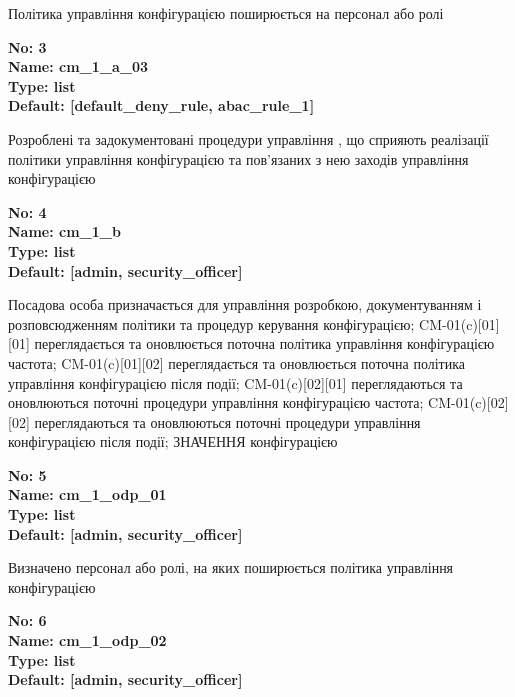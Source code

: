 \documentclass{article}
\begin{document}
{\footnotesize Політика управління конфігурацією поширюється на персонал або ролі}


{\footnotesize\bfseries
No: 3\\
Name: cm\_\allowbreak{}1\_\allowbreak{}a\_\allowbreak{}03\\
Type: list\\
Default: [\textquotedbl{}default\_\allowbreak{}deny\_\allowbreak{}rule\textquotedbl{}, \textquotedbl{}abac\_\allowbreak{}rule\_\allowbreak{}1\textquotedbl{}]
}

{\footnotesize Розроблені та задокументовані процедури управління , що сприяють реалізації політики управління конфігурацією та пов'язаних з нею заходів управління конфігурацією}


{\footnotesize\bfseries
No: 4\\
Name: cm\_\allowbreak{}1\_\allowbreak{}b\\
Type: list\\
Default: [\textquotedbl{}admin\textquotedbl{}, \textquotedbl{}security\_\allowbreak{}officer\textquotedbl{}]
}

{\footnotesize Посадова особа призначається для управління розробкою, документуванням і розповсюдженням політики та процедур керування конфігурацією; CM-01(c)[01][01] переглядається та оновлюється поточна політика управління конфігурацією частота; CM-01(c)[01][02] переглядається та оновлюється поточна політика управління конфігурацією після події; CM-01(c)[02][01] переглядаються та оновлюються поточні процедури управління конфігурацією частота; CM-01(c)[02][02] переглядаються та оновлюються поточні процедури управління конфігурацією після події; ЗНАЧЕННЯ конфігурацією}


{\footnotesize\bfseries
No: 5\\
Name: cm\_\allowbreak{}1\_\allowbreak{}odp\_\allowbreak{}01\\
Type: list\\
Default: [\textquotedbl{}admin\textquotedbl{}, \textquotedbl{}security\_\allowbreak{}officer\textquotedbl{}]
}

{\footnotesize Визначено персонал або ролі, на яких поширюється політика управління конфігурацією}


{\footnotesize\bfseries
No: 6\\
Name: cm\_\allowbreak{}1\_\allowbreak{}odp\_\allowbreak{}02\\
Type: list\\
Default: [\textquotedbl{}admin\textquotedbl{}, \textquotedbl{}security\_\allowbreak{}officer\textquotedbl{}]
}
\end{document}
